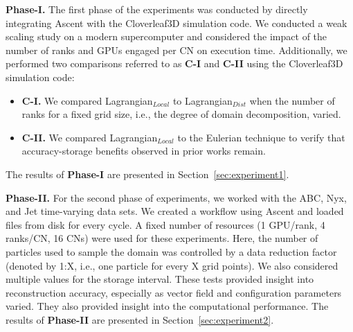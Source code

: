 %
\textbf{Phase-I.} The first phase of the experiments was conducted by directly integrating Ascent with the Cloverleaf3D simulation code. 
%
We conducted a weak scaling study on a modern supercomputer and considered the impact of the number of ranks and GPUs engaged per CN on execution time. 
%
Additionally, we performed two comparisons referred to as \textbf{C-I} and \textbf{C-II} using the Cloverleaf3D simulation code: 
%
\vspace{-1mm}
\begin{itemize}[leftmargin=*]
\item\textbf{C-I.} We compared Lagrangian$_{Local}$ to Lagrangian$_{Dist}$ when the number of ranks for a fixed grid size, i.e., the degree of domain decomposition, varied.
%
\item\textbf{C-II.} We compared Lagrangian$_{Local}$ to the Eulerian technique to verify that accuracy-storage benefits observed in prior works remain. 
\vspace{-1mm}
\end{itemize}
%
The results of \textbf{Phase-I} are presented in Section~\ref{sec:experiment1}.

\textbf{Phase-II.} For the second phase of experiments, we worked with the ABC, Nyx, and Jet time-varying data sets.
%
We created a workflow using Ascent and loaded files from disk for every cycle.
%
A fixed number of resources (1 GPU/rank, 4 ranks/CN, 16 CNs) were used for these experiments.
%
Here, the number of particles used to sample the domain was controlled by a data reduction factor (denoted by 1:X, i.e., one particle for every X grid points). 
%
%
We also considered multiple values for the storage interval. 
%
These tests provided insight into reconstruction accuracy, especially as vector field and configuration parameters varied. 
%
They also provided insight into the computational performance.
%
The results of \textbf{Phase-II} are presented in Section~\ref{sec:experiment2}.

%

